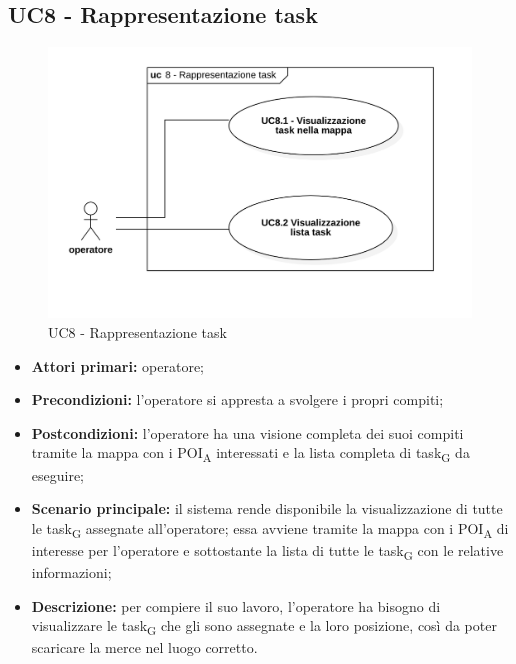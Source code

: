 \subsection{UC8 - Rappresentazione task}

\begin{figure}[H]
	\centering
	\includegraphics[scale=0.52]{res/images/uc8.png}
	\caption{UC8 - Rappresentazione task}
\end{figure}


\begin{itemize}
	\item 	\textbf{Attori primari:} operatore;
	\item 	\textbf{Precondizioni:} l'operatore si appresta a svolgere i propri compiti;
	\item 	\textbf{Postcondizioni:} l'operatore ha una visione completa dei suoi compiti tramite la mappa con i POI\textsubscript{A} interessati e la lista completa di task\textsubscript{G} da eseguire;
	\item 	\textbf{Scenario principale:} il sistema rende disponibile la visualizzazione di tutte le task\textsubscript{G} assegnate all'operatore; essa avviene tramite la mappa con i POI\textsubscript{A} di interesse per l'operatore e sottostante la lista di tutte le task\textsubscript{G} con le relative informazioni;
	\item 	\textbf{Descrizione:} per compiere il suo lavoro, l'operatore ha bisogno di visualizzare le task\textsubscript{G} che gli sono assegnate e la loro posizione, così da poter scaricare la merce nel luogo corretto.

\end{itemize}

